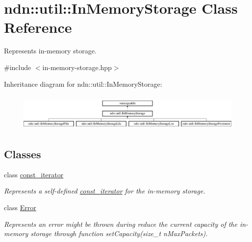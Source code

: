 \hypertarget{classndn_1_1util_1_1InMemoryStorage}{}\section{ndn\+:\+:util\+:\+:In\+Memory\+Storage Class Reference}
\label{classndn_1_1util_1_1InMemoryStorage}


Represents in-\/memory storage.  




{\ttfamily \#include $<$in-\/memory-\/storage.\+hpp$>$}

Inheritance diagram for ndn\+:\+:util\+:\+:In\+Memory\+Storage\+:\begin{figure}[H]
\begin{center}
\leavevmode
\includegraphics[height=1.875000cm]{classndn_1_1util_1_1InMemoryStorage}
\end{center}
\end{figure}
\subsection*{Classes}
\begin{DoxyCompactItemize}
\item 
class \hyperlink{classndn_1_1util_1_1InMemoryStorage_1_1const__iterator}{const\+\_\+iterator}
\begin{DoxyCompactList}\small\item\em Represents a self-\/defined \hyperlink{classndn_1_1util_1_1InMemoryStorage_1_1const__iterator}{const\+\_\+iterator} for the in-\/memory storage. \end{DoxyCompactList}\item 
class \hyperlink{classndn_1_1util_1_1InMemoryStorage_1_1Error}{Error}
\begin{DoxyCompactList}\small\item\em Represents an error might be thrown during reduce the current capacity of the in-\/memory storage through function set\+Capacity(size\+\_\+t n\+Max\+Packets). \end{DoxyCompactList}\end{DoxyCompactItemize}

